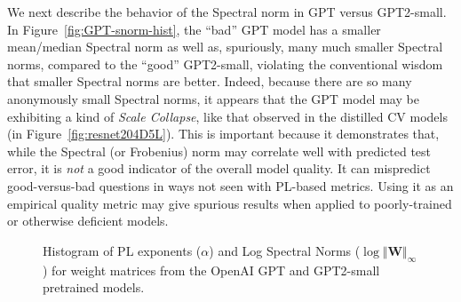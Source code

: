 We next describe the behavior of the Spectral norm in GPT versus GPT2-small.
In Figure~\ref{fig:GPT-snorm-hist}, the ``bad'' GPT model has a smaller mean/median Spectral norm as well as, spuriously, many much smaller Spectral norms, compared to the ``good'' GPT2-small, violating the conventional wisdom that smaller Spectral norms are better.
Indeed, because there are so many anonymously small Spectral norms, it appears that the GPT model may be exhibiting a kind of \emph{Scale Collapse}, like that observed in the distilled CV models (in Figure~\ref{fig:resnet204D5L}).
This is important because it demonstrates that, while the Spectral (or Frobenius) norm may correlate well with predicted test error, it is \emph{not} a good indicator of the overall model quality.
It can mispredict good-versus-bad questions in ways not seen with PL-based metrics.
Using it as an empirical quality metric may give spurious results when applied to poorly-trained or otherwise deficient models. 

\begin{figure}[h]
    \centering
    \qquad
   \caption{Histogram of PL exponents ($\alpha$) and Log Spectral Norms ($\log\Vert\mathbf{W}\Vert_{\infty}$) for weight matrices from the OpenAI GPT and GPT2-small pretrained models.}
   
\label{fig:GPT-hist}
\end{figure}


